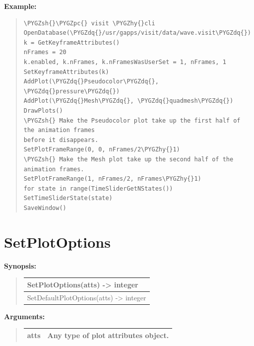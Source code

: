 \documentclass[letterpaper,10pt,english]{sphinxmanual}
\def\PYGZsh{\char`\#}
\def\PYGZpc{\char`\%}
\def\PYGZhy{\char`\-}
\def\PYGZdq{\char`\"}
\begin{document}
\begin{DUlineblock}{0em}
\item[] 
\end{DUlineblock}

\begin{DUlineblock}{0em}
\item[] \textbf{Example:}
\item[] 
\end{DUlineblock}
\begin{quote}

\begin{Verbatim}[commandchars=\\\{\}]
\PYGZsh{}\PYGZpc{} visit \PYGZhy{}cli
OpenDatabase(\PYGZdq{}/usr/gapps/visit/data/wave.visit\PYGZdq{})
k = GetKeyframeAttributes()
nFrames = 20
k.enabled, k.nFrames, k.nFramesWasUserSet = 1, nFrames, 1
SetKeyframeAttributes(k)
AddPlot(\PYGZdq{}Pseudocolor\PYGZdq{}, \PYGZdq{}pressure\PYGZdq{})
AddPlot(\PYGZdq{}Mesh\PYGZdq{}, \PYGZdq{}quadmesh\PYGZdq{})
DrawPlots()
\PYGZsh{} Make the Pseudocolor plot take up the first half of the animation frames
before it disappears.
SetPlotFrameRange(0, 0, nFrames/2\PYGZhy{}1)
\PYGZsh{} Make the Mesh plot take up the second half of the animation frames.
SetPlotFrameRange(1, nFrames/2, nFrames\PYGZhy{}1)
for state in range(TimeSliderGetNStates())
SetTimeSliderState(state)
SaveWindow()
\end{Verbatim}
\end{quote}


\section{SetPlotOptions}
\label{functions:setplotoptions}
\begin{DUlineblock}{0em}
\item[] \textbf{Synopsis:}
\end{DUlineblock}
\begin{quote}

\begin{tabulary}{\linewidth}{|L|}
\hline

SetPlotOptions(atts) -\textgreater{} integer
\\
\hline
SetDefaultPlotOptions(atts) -\textgreater{} integer
\\
\hline\end{tabulary}

\end{quote}

\begin{DUlineblock}{0em}
\item[] 
\item[] \textbf{Arguments:}
\end{DUlineblock}
\begin{quote}

\begin{tabulary}{\linewidth}{|L|L|}
\hline

atts
 & 
Any type of plot attributes object.
\\
\hline\end{tabulary}

\end{quote}
\end{document}
